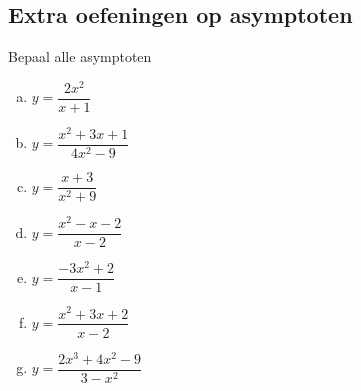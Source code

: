 \documentclass[12pt]{article}
\begin{document}
\begin{theorie}

\pagebreak
\subsection{Extra oefeningen op asymptoten}

\end{theorie}

\begin{oefening} %
Bepaal alle asymptoten\\
\begin{multicols}{2}
\begin{enumerate}[(a)]
  \itemsep1em
  \item $\displaystyle y=\dfrac{2x^2}{x+1}$
  \item $\displaystyle y=\dfrac{x^2+3x+1}{4x^2-9}$
  \item $\displaystyle y=\dfrac{x+3}{x^2+9}$
  \item $\displaystyle y=\dfrac{x^2-x-2}{x-2}$
  \item $\displaystyle y=\dfrac{-3x^2+2}{x-1}$
  \item $\displaystyle y=\dfrac{x^2+3x+2}{x-2}$
  \item $\displaystyle y=\dfrac{2x^3+4x^2-9}{3-x^2}$
\end{enumerate}
\end{multicols}
\end{oefening}
\end{document}
